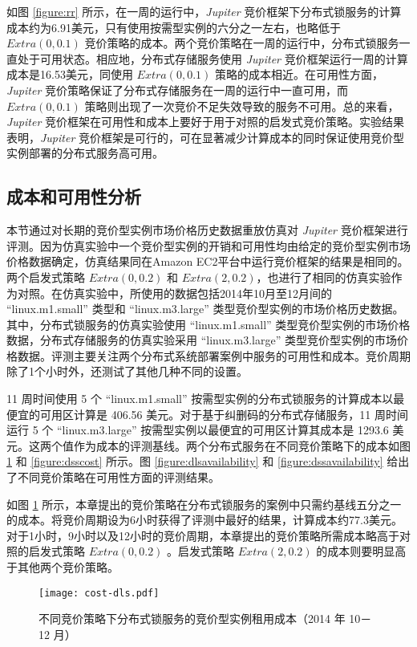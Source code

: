 如图 \ref{figure:rr} 所示，在一周的运行中，\emph{Jupiter} 竞价框架下分布式锁服务的计算成本约为6.91美元，只有使用按需型实例的六分之一左右，也略低于 $Extra(0, 0.1)$ 竞价策略的成本。两个竞价策略在一周的运行中，分布式锁服务一直处于可用状态。相应地，分布式存储服务使用 \emph{Jupiter} 竞价框架运行一周的计算成本是16.53美元，同使用 $Extra(0, 0.1)$ 策略的成本相近。在可用性方面，\emph{Jupiter} 竞价策略保证了分布式存储服务在一周的运行中一直可用，而 $Extra(0, 0.1)$ 策略则出现了一次竞价不足失效导致的服务不可用。总的来看，\emph{Jupiter} 竞价框架在可用性和成本上要好于用于对照的启发式竞价策略。实验结果表明，\emph{Jupiter} 竞价框架是可行的，可在显著减少计算成本的同时保证使用竞价型实例部署的分布式服务高可用。

\subsection{成本和可用性分析}
\label{subsec:ca}
本节通过对长期的竞价型实例市场价格历史数据重放仿真对 \emph{Jupiter} 竞价框架进行评测。因为仿真实验中一个竞价型实例的开销和可用性均由给定的竞价型实例市场价格数据确定，仿真结果同在Amazon EC2平台中运行竞价框架的结果是相同的。两个启发式策略 $Extra(0, 0.2)$ 和 $Extra(2, 0.2)$，也进行了相同的仿真实验作为对照。在仿真实验中，所使用的数据包括2014年10月至12月间的 ``linux.m1.small'' 类型和 ``linux.m3.large'' 类型竞价型实例的市场价格历史数据。其中，分布式锁服务的仿真实验使用 ``linux.m1.small'' 类型竞价型实例的市场价格数据，分布式存储服务的仿真实验采用 ``linux.m3.large'' 类型竞价型实例的市场价格数据。评测主要关注两个分布式系统部署案例中服务的可用性和成本。竞价周期除了1个小时外，还测试了其他几种不同的设置。

11 周时间使用 5 个 ``linux.m1.small'' 按需型实例的分布式锁服务的计算成本以最便宜的可用区计算是 406.56 美元。对于基于纠删码的分布式存储服务，11 周时间运行 5 个 ``linux.m3.large'' 按需型实例以最便宜的可用区计算其成本是 1293.6 美元。这两个值作为成本的评测基线。两个分布式服务在不同竞价策略下的成本如图 \ref{figure:dlscost} 和 \ref{figure:dsscost} 所示。图 \ref{figure:dlsavailability} 和 \ref{figure:dssavailability} 给出了不同竞价策略在可用性方面的评测结果。

如图 \ref{figure:dlscost} 所示，本章提出的竞价策略在分布式锁服务的案例中只需约基线五分之一的成本。将竞价周期设为6小时获得了评测中最好的结果，计算成本约77.3美元。对于1小时，9小时以及12小时的竞价周期，本章提出的竞价策略所需成本略高于对照的启发式策略 $Extra(0, 0.2)$ 。启发式策略 $Extra(2, 0.2)$ 的成本则要明显高于其他两个竞价策略。
\begin{figure}
  \centering
  \texttt{[image: cost-dls.pdf]}
  \caption{不同竞价策略下分布式锁服务的竞价型实例租用成本（2014 年 10－12 月）}
  \label{figure:dlscost}
\end{figure}

